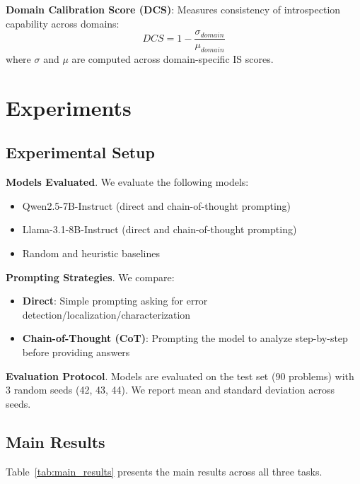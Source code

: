 \documentclass{article}
\begin{document}
\textbf{Domain Calibration Score (DCS)}: Measures consistency of introspection capability across domains:
\begin{equation}
DCS = 1 - \frac{\sigma_{domain}}{\mu_{domain}}
\end{equation}
where $\sigma$ and $\mu$ are computed across domain-specific IS scores.

\section{Experiments}

\subsection{Experimental Setup}

\textbf{Models Evaluated}. We evaluate the following models:
\begin{itemize}
    \item Qwen2.5-7B-Instruct (direct and chain-of-thought prompting)
    \item Llama-3.1-8B-Instruct (direct and chain-of-thought prompting)
    \item Random and heuristic baselines
\end{itemize}

\textbf{Prompting Strategies}. We compare:
\begin{itemize}
    \item \textbf{Direct}: Simple prompting asking for error detection/localization/characterization
    \item \textbf{Chain-of-Thought (CoT)}: Prompting the model to analyze step-by-step before providing answers
\end{itemize}

\textbf{Evaluation Protocol}. Models are evaluated on the test set (90 problems) with 3 random seeds (42, 43, 44). We report mean and standard deviation across seeds.

\subsection{Main Results}

Table~\ref{tab:main_results} presents the main results across all three tasks.
\end{document}
